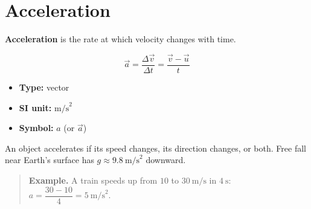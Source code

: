 
\section*{Acceleration}

\textbf{Acceleration} is the rate at which velocity changes with time.

\begin{equation}
  \vec{a} = \frac{\Delta \vec{v}}{\Delta t} = \frac{\vec{v} - \vec{u}}{t}
\end{equation}

\begin{itemize}
  \item \textbf{Type:} vector
  \item \textbf{SI unit:} $\text{m/s}^{2}$
  \item \textbf{Symbol:} $a$ (or $\vec{a}$)
\end{itemize}

An object accelerates if its speed changes, its direction changes, or
both. Free fall near Earth's surface has
$g \approx 9.8\ \text{m/s}^{2}$ downward.

\begin{quote}
\textbf{Example.} A train speeds up from $10$ to $30\ \text{m/s}$ in
$4\ \text{s}$:\quad $a = \dfrac{30-10}{4} = 5\ \text{m/s}^{2}$.
\end{quote}
